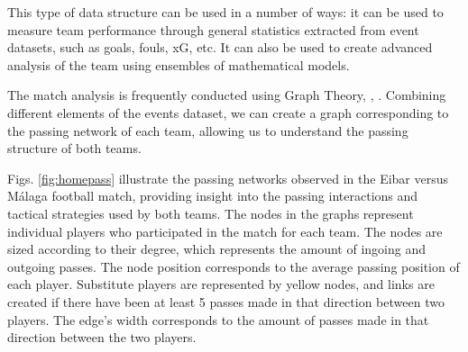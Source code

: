 \documentclass[
  10pt,
  twoside,nohyper]{book}
\begin{document}
This type of data structure can be used in a number of ways: it can be
used to measure team performance through general statistics extracted
from event datasets, such as goals, fouls, xG, etc. It can also be used to create advanced analysis of the team using ensembles of mathematical models.

The match analysis is frequently conducted using Graph Theory, \autocite{Buldu}, \autocite{NOVILLO2024114355}. Combining
different elements of the events dataset, we can create a graph
corresponding to the passing network of each team, allowing us to
understand the passing structure of both teams.

Figs. \ref{fig:homepass} illustrate the
passing networks observed in the Eibar versus Málaga football match,
providing insight into the passing interactions and tactical strategies
used by both teams. The nodes in the graphs represent individual players
who participated in the match for each team. The nodes are sized
according to their degree, which represents the amount of ingoing and
outgoing passes. The node position corresponds to the average passing
position of each player. Substitute players are represented by yellow nodes,
and links are created if there have been at least 5 passes made in that
direction between two players. The edge's width corresponds to the
amount of passes made in that direction between the two players.
\end{document}
